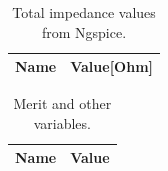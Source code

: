 \begin{table}[h]
	\centering
	\begin{tabular}{|l|r|}
		\hline    
		{\bf Name} & {\bf Value[Ohm]} \\ \hline
    		
    		
	\end{tabular}
	
	\caption{Total impedance values from Ngspice.}
    
\label{tab:imp_sim}
\end{table}

\begin{table}[h]
	\centering
	\begin{tabular}{|l|r|}
		\hline    
		{\bf Name} & {\bf Value} \\ \hline
    		
	\end{tabular}
	
	\caption{Merit and other variables.}
    
\label{tab:merit}
\end{table}


